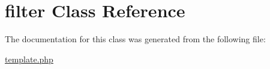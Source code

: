 \hypertarget{classfilter}{
\section{filter Class Reference}
\label{classfilter}
}


The documentation for this class was generated from the following file:\begin{DoxyCompactItemize}
\item 
\hyperlink{template_8php}{template.php}\end{DoxyCompactItemize}
